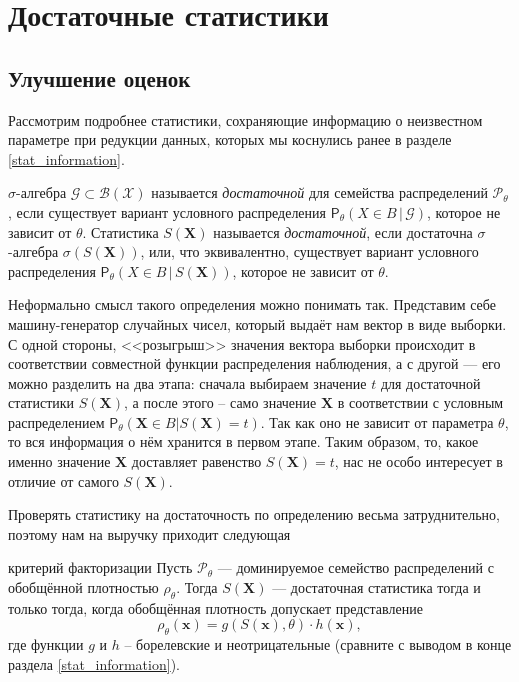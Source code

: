 \section{Достаточные статистики}\label{sufficiency}

\subsection{Улучшение оценок}

Рассмотрим подробнее статистики, сохраняющие информацию о неизвестном параметре при редукции данных, которых мы коснулись ранее в разделе \ref{stat_information}.

\begin{definition}
    $\sigma$-алгебра $\mathcal{G} \subset \mathcal{B}(\mathcal{X})$ называется \textit{достаточной} для семейства распределений $\mathcal P_{\theta}$, если существует вариант условного распределения $\mathsf P_{\theta}(X \in B\,|\,\mathcal{G})$, которое не зависит от $\theta$. Статистика $S(\mathbf X)$ называется \textit{достаточной}, если достаточна $\sigma$-алгебра $\sigma(S(\mathbf X))$, или, что эквивалентно, существует вариант условного распределения $\mathsf P_{\theta}(X \in B\,|\,S(\mathbf X))$, которое не зависит от $\theta$.
\end{definition}

Неформально смысл такого определения можно понимать так. Представим себе машину-генератор случайных чисел, который выдаёт нам вектор в виде выборки. С одной стороны, <<розыгрыш>> значения вектора выборки происходит в соответствии совместной функции распределения наблюдения, а с другой --- его можно разделить на два этапа: сначала выбираем значение $t$ для достаточной статистики $S(\mathbf X)$, а после этого -- само значение $\mathbf X$ в соответствии с условным распределением $\mathsf P_{\theta}(\mathbf X \in B|S(\mathbf X) = t)$. Так как оно не зависит от параметра $\theta$, то вся информация о нём хранится в первом этапе. Таким образом, то, какое именно значение $\mathbf X$ доставляет равенство $S(\mathbf X) = t$, нас не особо интересует в отличие от самого $S(\mathbf X)$.

Проверять статистику на достаточность по определению весьма затруднительно, поэтому нам на выручку приходит следующая
\begin{theorem}{критерий факторизации}{}
Пусть $\mathcal P_{\theta}$ --- доминируемое семейство распределений с обобщённой плотностью $\rho_{\theta}$. Тогда $S(\mathbf X)$ --- достаточная статистика тогда и только тогда, когда обобщённая плотность допускает представление
\[
\rho_{\theta}(\mathbf{x}) = g(S(\mathbf{x}), \theta) \cdot h(\mathbf{x}),
\]
где функции $g$ и $h$ -- борелевские и неотрицательные (сравните с выводом в конце раздела \ref{stat_information}).
\end{theorem}

